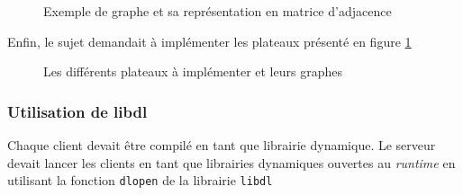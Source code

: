 \begin{figure}[H]
	\centering
	\hspace{2em}
	\caption{Exemple de graphe et sa représentation en matrice d'adjacence}

\end{figure}

Enfin, le sujet demandait à implémenter les plateaux présenté en figure \ref{fig:all-boards}

\begin{figure}[H]
	\centering

	\caption{Les différents plateaux à implémenter et leurs graphes}
	\label{fig:all-boards}
\end{figure}

\subsubsection{Utilisation de libdl}

Chaque client devait être compilé en tant que librairie dynamique.
Le serveur devait lancer les clients en tant que librairies dynamiques ouvertes
au \textit{runtime} en utilisant la fonction \verb|dlopen| de la librairie \verb|libdl|